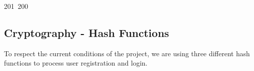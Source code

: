 201~200~\documentclass{article}
\begin{document}
	                                                                                                                                                                                                                                                                                                	                                                                                                                                        	    	                                                                                                	                                                                                                                                                                                                                                                \subsection{Cryptography - Hash Functions}
	                                                                                                                                                                                                                                                                                                	                                                                                                                                        	    	                                                                                                	                                                                                                                                                                                                                                                To respect the current conditions of the project, we are using three different hash functions to process user 
	                                                                                                                                                                                                                                                                                                	                                                                                                                                        	    	                                                                                                	                                                                                                                                                                                                                                                registration and login.
\end{document}
